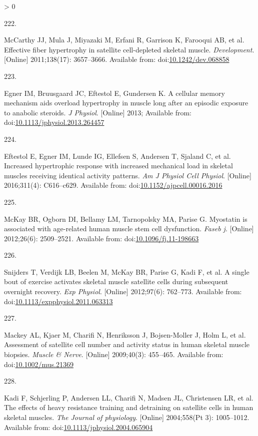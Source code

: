 \documentclass[twoside,10pt]{gihclass} %
\newlength{\cslhangindent}
\newlength{\csllabelwidth}
\newenvironment{CSLReferences}[3] %
 {%
  \setlength{\parindent}{0pt}
  \ifodd #1 \everypar{\setlength{\hangindent}{\cslhangindent}}\ignorespaces\fi
  \ifnum #2 > 0
  \setlength{\parskip}{#2\baselineskip}
  \fi
 }%
 {}
\newcommand{\CSLLeftMargin}[1]{\parbox[t]{\maxof{\widthof{#1}}{\csllabelwidth}}{#1}}
\newcommand{\CSLRightInline}[1]{\parbox[t]{\linewidth}{#1}}
\begin{document}
\begin{CSLReferences}{0}{0}
\leavevmode\hypertarget{ref-RN2864}{}%
\CSLLeftMargin{222. }
\CSLRightInline{McCarthy JJ, Mula J, Miyazaki M, Erfani R, Garrison K, Farooqui AB, et al. Effective fiber hypertrophy in satellite cell-depleted skeletal muscle. \emph{Development}. {[}Online{]} 2011;138(17): 3657--3666. Available from: doi:\href{https://doi.org/10.1242/dev.068858}{10.1242/dev.068858}}

\leavevmode\hypertarget{ref-RN912}{}%
\CSLLeftMargin{223. }
\CSLRightInline{Egner IM, Bruusgaard JC, Eftestol E, Gundersen K. A cellular memory mechanism aids overload hypertrophy in muscle long after an episodic exposure to anabolic steroids. \emph{J Physiol}. {[}Online{]} 2013; Available from: doi:\href{https://doi.org/10.1113/jphysiol.2013.264457}{10.1113/jphysiol.2013.264457}}

\leavevmode\hypertarget{ref-RN2104}{}%
\CSLLeftMargin{224. }
\CSLRightInline{Eftestol E, Egner IM, Lunde IG, Ellefsen S, Andersen T, Sjaland C, et al. Increased hypertrophic response with increased mechanical load in skeletal muscles receiving identical activity patterns. \emph{Am J Physiol Cell Physiol}. {[}Online{]} 2016;311(4): C616--c629. Available from: doi:\href{https://doi.org/10.1152/ajpcell.00016.2016}{10.1152/ajpcell.00016.2016}}

\leavevmode\hypertarget{ref-RN2872}{}%
\CSLLeftMargin{225. }
\CSLRightInline{McKay BR, Ogborn DI, Bellamy LM, Tarnopolsky MA, Parise G. Myostatin is associated with age-related human muscle stem cell dysfunction. \emph{Faseb j}. {[}Online{]} 2012;26(6): 2509--2521. Available from: doi:\href{https://doi.org/10.1096/fj.11-198663}{10.1096/fj.11-198663}}

\leavevmode\hypertarget{ref-RN1048}{}%
\CSLLeftMargin{226. }
\CSLRightInline{Snijders T, Verdijk LB, Beelen M, McKay BR, Parise G, Kadi F, et al. A single bout of exercise activates skeletal muscle satellite cells during subsequent overnight recovery. \emph{Exp Physiol}. {[}Online{]} 2012;97(6): 762--773. Available from: doi:\href{https://doi.org/10.1113/expphysiol.2011.063313}{10.1113/expphysiol.2011.063313}}

\leavevmode\hypertarget{ref-RN2081}{}%
\CSLLeftMargin{227. }
\CSLRightInline{Mackey AL, Kjaer M, Charifi N, Henriksson J, Bojsen-Moller J, Holm L, et al. Assessment of satellite cell number and activity status in human skeletal muscle biopsies. \emph{Muscle \& Nerve}. {[}Online{]} 2009;40(3): 455--465. Available from: doi:\href{https://doi.org/10.1002/mus.21369}{10.1002/mus.21369}}

\leavevmode\hypertarget{ref-RN2617}{}%
\CSLLeftMargin{228. }
\CSLRightInline{Kadi F, Schjerling P, Andersen LL, Charifi N, Madsen JL, Christensen LR, et al. The effects of heavy resistance training and detraining on satellite cells in human skeletal muscles. \emph{The Journal of physiology}. {[}Online{]} 2004;558(Pt 3): 1005--1012. Available from: doi:\href{https://doi.org/10.1113/jphysiol.2004.065904}{10.1113/jphysiol.2004.065904}}


\end{CSLReferences}
\end{document}
